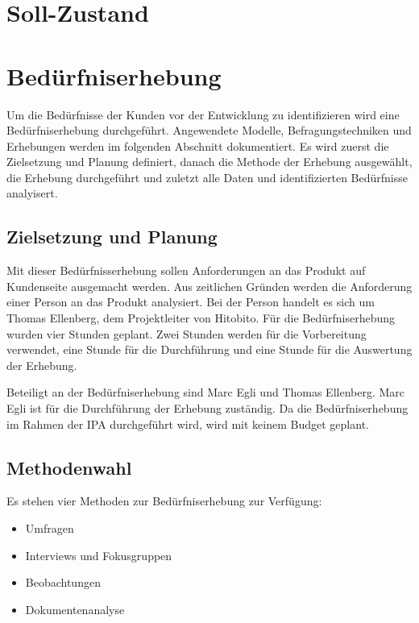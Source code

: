 \section{Soll-Zustand}

\section{Bedürfniserhebung}
Um die Bedürfnisse der Kunden vor der Entwicklung zu identifizieren wird eine Bedürfniserhebung durchgeführt. 
Angewendete Modelle, Befragungstechniken und Erhebungen werden im folgenden Abschnitt dokumentiert. Es wird zuerst die Zielsetzung und Planung definiert,
danach die Methode der Erhebung ausgewählt, die Erhebung durchgeführt und zuletzt alle Daten und identifizierten Bedürfnisse analyisert.

\subsection{Zielsetzung und Planung}
Mit dieser Bedürfnisserhebung sollen Anforderungen an das Produkt auf Kundenseite ausgemacht werden. Aus zeitlichen Gründen
werden die Anforderung einer Person an das Produkt analysiert. Bei der Person handelt es sich um Thomas Ellenberg, dem Projektleiter von Hitobito.
Für die Bedürfniserhebung wurden vier Stunden geplant. Zwei Stunden werden für die Vorbereitung verwendet, eine Stunde für die Durchführung und
eine Stunde für die Auswertung der Erhebung. 

Beteiligt an der Bedürfniserhebung sind Marc Egli und Thomas Ellenberg. Marc Egli ist für die
Durchführung der Erhebung zuständig. Da die Bedürfniserhebung im Rahmen der IPA durchgeführt wird, wird mit keinem Budget geplant.

\newpage

\subsection{Methodenwahl}

Es stehen vier Methoden zur Bedürfniserhebung zur Verfügung:

\begin{itemize}
   \item Umfragen
   \item Interviews und Fokusgruppen
   \item Beobachtungen
   \item Dokumentenanalyse
\end{itemize}

